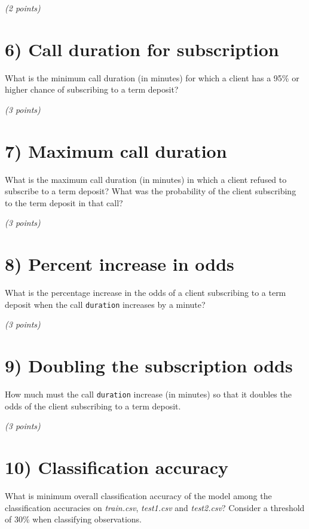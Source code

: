 \documentclass[
  letterpaper,
  DIV=11,
  numbers=noendperiod]{scrreprt}
\begin{document}
\emph{(2 points)}

\section{6) Call duration for
subscription}\label{call-duration-for-subscription}

What is the minimum call duration (in minutes) for which a client has a
95\% or higher chance of subscribing to a term deposit?

\emph{(3 points)}

\section{7) Maximum call duration}\label{maximum-call-duration}

What is the maximum call duration (in minutes) in which a client refused
to subscribe to a term deposit? What was the probability of the client
subscribing to the term deposit in that call?

\emph{(3 points)}

\section{8) Percent increase in odds}\label{percent-increase-in-odds}

What is the percentage increase in the odds of a client subscribing to a
term deposit when the call \texttt{duration} increases by a minute?

\emph{(3 points)}

\section{9) Doubling the subscription
odds}\label{doubling-the-subscription-odds}

How much must the call \texttt{duration} increase (in minutes) so that
it doubles the odds of the client subscribing to a term deposit.

\emph{(3 points)}

\section{10) Classification accuracy}\label{classification-accuracy}

What is minimum overall classification accuracy of the model among the
classification accuracies on \emph{train.csv}, \emph{test1.csv} and
\emph{test2.csv}? Consider a threshold of 30\% when classifying
observations.
\end{document}
